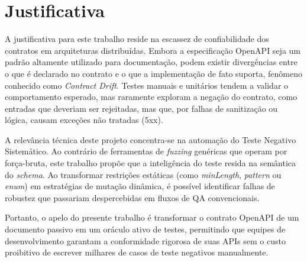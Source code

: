 \section{Justificativa}
A justificativa para este trabalho reside na escassez de confiabilidade dos contratos em arquiteturas distribuídas. Embora a especificação OpenAPI seja um padrão altamente utilizado para documentação, podem existir divergências entre o que é declarado no contrato e o que a implementação de fato suporta, fenômeno conhecido como \textit{Contract Drift}. Testes manuais e unitários tendem a validar o comportamento esperado, mas raramente exploram a negação do contrato, como entradas que deveriam ser rejeitadas, mas que, por falhas de sanitização ou lógica, causam exceções não tratadas (5xx).

A relevância técnica deste projeto concentra-se na automação do Teste Negativo Sistemático. Ao contrário de ferramentas de \textit{fuzzing} genéricas que operam por força-bruta, este trabalho propõe que a inteligência do teste resida na semântica do \textit{schema}. Ao transformar restrições estáticas (como \textit{minLength}, \textit{pattern} ou \textit{enum}) em estratégias de mutação dinâmica, é possível identificar falhas de robustez que passariam despercebidas em fluxos de QA convencionais.

Portanto, o apelo do presente trabalho é transformar o contrato OpenAPI de um documento passivo em um oráculo ativo de testes, permitindo que equipes de desenvolvimento garantam a conformidade rigorosa de suas APIs sem o custo proibitivo de escrever milhares de casos de teste negativos manualmente.